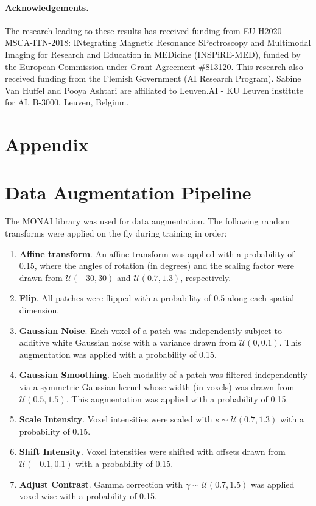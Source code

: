 \documentclass[a4,12pt]{article}
\begin{document}
	
	\paragraph{Acknowledgements.}
	The research leading to these results has received funding from EU H2020 MSCA-ITN-2018: INtegrating Magnetic Resonance SPectroscopy and Multimodal Imaging for Research and Education in MEDicine (INSPiRE-MED), funded by the European Commission under Grant Agreement \#813120. This research also received funding from the Flemish Government (AI Research Program). Sabine Van Huffel and Pooya Ashtari are affiliated to Leuven.AI - KU Leuven institute for AI, B-3000, Leuven, Belgium. 
	
	
	\appendix
	\section*{Appendix} \label{app: appendix}
	
	\section{Data Augmentation Pipeline} \label{app: data augmentation pipeline}
	The MONAI library \citep{monai2021} was used for data augmentation. The following random transforms were applied on the fly during training in order:
	\begin{enumerate}	
		\item  \textbf{Affine transform}. An affine transform was applied with a probability of 0.15, where the angles of rotation (in degrees) and the scaling factor were drawn from $ \mathcal{U}(-30, 30) $ and $ \mathcal{U}(0.7, 1.3) $, respectively.
		
		\item \textbf{Flip}. All patches were flipped with a probability of 0.5 along each spatial dimension.
		
		\item \textbf{Gaussian Noise}. Each voxel of a patch was independently subject to additive white Gaussian noise with a variance drawn from $ \mathcal{U}(0, 0.1) $. This augmentation was applied with a probability of 0.15. 
		
		\item \textbf{Gaussian Smoothing}. Each modality of a patch was filtered independently via a symmetric Gaussian kernel whose width (in voxels) was drawn from $ \mathcal{U}(0.5, 1.5) $. This augmentation was applied with a probability of 0.15. 
		
		\item \textbf{Scale Intensity}. Voxel intensities were scaled with $ s \sim \mathcal{U}(0.7, 1.3) $ with a probability of 0.15.
		
		\item \textbf{Shift Intensity}. Voxel intensities were shifted with offsets drawn from $ \mathcal{U}(-0.1, 0.1) $ with a probability of 0.15.
		
		\item \textbf{Adjust Contrast}. Gamma correction with $ \gamma \sim \mathcal{U}(0.7, 1.5) $ was applied voxel-wise with a probability of 0.15.
	\end{enumerate}	
	
\end{document}
